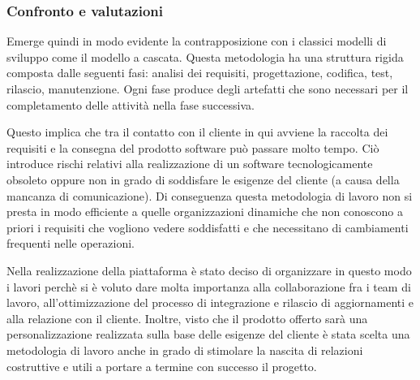\subsubsection{Confronto e valutazioni}
Emerge quindi in modo evidente la contrapposizione con i classici modelli di sviluppo come il modello a cascata.
Questa metodologia ha una struttura rigida composta dalle seguenti fasi: analisi dei requisiti, progettazione, codifica, test, rilascio, manutenzione.
Ogni fase produce degli artefatti che sono necessari per il completamento delle attività nella fase successiva. 

Questo implica che tra il contatto con il cliente in qui avviene la raccolta dei requisiti e la consegna del prodotto software può passare molto tempo.
Ciò introduce rischi relativi alla realizzazione di un software tecnologicamente obsoleto oppure non in grado di soddisfare le
esigenze del cliente (a causa della mancanza di comunicazione).
Di conseguenza questa metodologia di lavoro non si presta in modo efficiente a quelle organizzazioni dinamiche che non conoscono
a priori i requisiti che vogliono vedere soddisfatti e che necessitano di cambiamenti frequenti nelle operazioni.

Nella realizzazione della piattaforma è stato deciso di organizzare in questo modo i lavori perchè si è voluto dare molta importanza
alla collaborazione fra i team di lavoro, all'ottimizzazione del processo di integrazione e rilascio di aggiornamenti e
alla relazione con il cliente. Inoltre, visto che il prodotto offerto sarà una personalizzazione realizzata sulla base delle esigenze del cliente
è stata scelta una metodologia di lavoro anche in grado di stimolare la nascita di relazioni costruttive e utili a portare a termine con successo il progetto.


